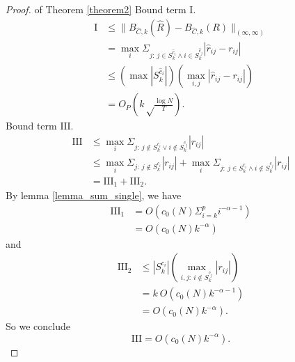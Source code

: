 \begin{proof}{ of Theorem \ref{theorem2}}
    Bound term $\mathrm{I}$. 
    \begin{equation}
    	\begin{split}
    	    \mathrm{I} &\leq \| B_{\hat{C}, k}(\hat R) - B_{\hat{C}, k}(R) \|_{(\infty, 
    	        \infty)} \\
        	&= \max_i \Sigma_{j:\ j\in S_{k}^{\hat c_i} \land i\in S_{k}^{\hat c_j}} |\hat 
        	    r_{ij} - r_{ij}| \\
            &\leq (\max |S_{k}^{\hat c_i}|)  (\max_{i,j} 
                |\hat r_{ij} - r_{ij}|)  \\
            &= O_P(k \sqrt\frac{\log N}{T}). 
    	\end{split}  
    	\label{I res}
      \end{equation}
    Bound term $\mathrm{III}$. 
    \begin{equation}
        \begin{split}
    	    \mathrm{III} &\leq \max_i \Sigma_{j:\ j \notin S_{k}^{c_i} \lor i 
    	        \notin  S_{k}^{c_j}} |r_{ij}| \\
        	&\leq \max_i \Sigma_{j:\ j \notin S_{k}^{c_i}} |r_{ij}| + \max_i \Sigma_{j:\
        	    j\in S_{k}^{c_i} \land i\notin S_{k}^{c_j}} |r_{ij}|  \\
    		&= \mathrm{III_1} + \mathrm{III_2}.
        \end{split}  
        \label{III}  
    \end{equation}
    By lemma \ref{lemma_sum_single}, we have 
    \begin{equation}
    	\begin{split}
    		\mathrm{III_1}  &= O(  c_0(N) \Sigma_{i=k}^p 
    		    i^{-\alpha-1}  ) \\
      	    &= O( c_0(N) k^{-\alpha} )
        \end{split}
    \end{equation}
    and 
    \begin{equation}
    	\begin{split}
    		\mathrm{III_2} &\leq |S_{k}^{c_i}| ( \max_{i,j:\ i\notin S_{k}^{c_j}} |r_{ij}| )     \\
            &= k \ O( c_0(N) k^{-\alpha-1})  \\
            &= O( c_0(N) k^{-\alpha} ).
    	\end{split}
    \end{equation}
    So we conclude 
    \begin{equation}
        \mathrm{III} = O( c_0(N) k^{-\alpha} ). 
        \label{III res}
    \end{equation}
        

\end{proof}
